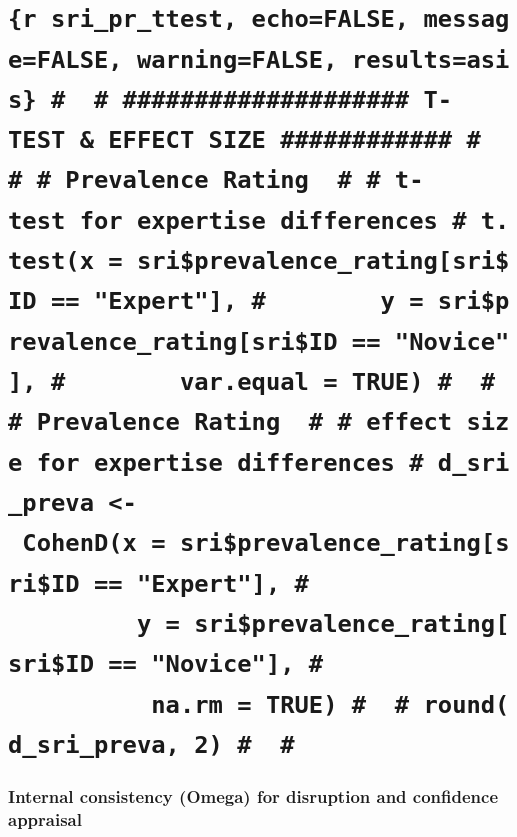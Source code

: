 \documentclass[
]{article}
\begin{document}
\section{\texorpdfstring{\texttt{\{r\ sri\_pr\_ttest,\ echo=FALSE,\ message=FALSE,\ warning=FALSE,\ results=\textquotesingle{}asis\textquotesingle{}\}\ \#\ \ \#\ \#\#\#\#\#\#\#\#\#\#\#\#\#\#\#\#\#\#\#\#\ T-TEST\ \&\ EFFECT\ SIZE\ \#\#\#\#\#\#\#\#\#\#\#\#\ \#\ \ \#\ \#\ Prevalence\ Rating\ \ \#\ \#\ t-test\ for\ expertise\ differences\ \#\ t.test(x\ =\ sri\$prevalence\_rating{[}sri\$ID\ ==\ "Expert"{]},\ \#\ \ \ \ \ \ \ \ y\ =\ sri\$prevalence\_rating{[}sri\$ID\ ==\ "Novice"{]},\ \#\ \ \ \ \ \ \ \ var.equal\ =\ TRUE)\ \#\ \ \#\ \#\ Prevalence\ Rating\ \ \#\ \#\ effect\ size\ for\ expertise\ differences\ \#\ d\_sri\_preva\ \textless{}-\ CohenD(x\ =\ sri\$prevalence\_rating{[}sri\$ID\ ==\ "Expert"{]},\ \#\ \ \ \ \ \ \ \ \ \ \ \ \ \ \ \ \ \ \ \ \ \ \ y\ =\ sri\$prevalence\_rating{[}sri\$ID\ ==\ "Novice"{]},\ \#\ \ \ \ \ \ \ \ \ \ \ \ \ \ \ \ \ \ \ \ \ \ \ na.rm\ =\ TRUE)\ \#\ \ \#\ round(d\_sri\_preva,\ 2)\ \#\ \ \#}}{\{r sri\_pr\_ttest, echo=FALSE, message=FALSE, warning=FALSE, results=\textquotesingle asis\textquotesingle\} \#  \# \#\#\#\#\#\#\#\#\#\#\#\#\#\#\#\#\#\#\#\# T-TEST \& EFFECT SIZE \#\#\#\#\#\#\#\#\#\#\#\# \#  \# \# Prevalence Rating  \# \# t-test for expertise differences \# t.test(x = sri\$prevalence\_rating{[}sri\$ID == "Expert"{]}, \#        y = sri\$prevalence\_rating{[}sri\$ID == "Novice"{]}, \#        var.equal = TRUE) \#  \# \# Prevalence Rating  \# \# effect size for expertise differences \# d\_sri\_preva \textless- CohenD(x = sri\$prevalence\_rating{[}sri\$ID == "Expert"{]}, \#                       y = sri\$prevalence\_rating{[}sri\$ID == "Novice"{]}, \#                       na.rm = TRUE) \#  \# round(d\_sri\_preva, 2) \#  \#}}\label{r-sri_pr_ttest-echofalse-messagefalse-warningfalse-resultsasis-t-test-effect-size-prevalence-rating-t-test-for-expertise-differences-t.testx-sriprevalence_ratingsriid-expert-y-sriprevalence_ratingsriid-novice-var.equal-true-prevalence-rating-effect-size-for-expertise-differences-d_sri_preva---cohendx-sriprevalence_ratingsriid-expert-y-sriprevalence_ratingsriid-novice-na.rm-true-roundd_sri_preva-2}

\subsubsection{Internal consistency (Omega) for disruption and
confidence
appraisal}\label{internal-consistency-omega-for-disruption-and-confidence-appraisal}
\end{document}
